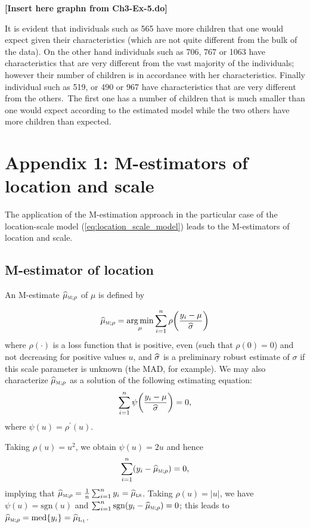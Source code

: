 \begin{stexample}
\textbf{[Insert here  graphn from Ch3-Ex-5.do]}\newline

It is evident that individuals such as 565 have more children that one would
expect given their characteristics (which are not quite\textbf{ }different
from the bulk of the data). On the other hand individuals such as 706, 767 or
1063 have characteristics that are very different from the vast majority of
the individuals; however their number of children is in accordance with her
characteristics. Finally individual such as 519, or 490 or 967 have
characteristics that are very different from the others.\ The first one has a
number of children that is much smaller than one would expect according to the
estimated model while the two others have more children than expected.
\end{stexample}

\section{Appendix 1: M-estimators of location and scale}
\label{sec:robreg:appendix1}

The application of the M-estimation approach in the particular case of the
location-scale model (\ref{eq:location_scale_model}) leads to the M-estimators
of location and scale.

\subsection{M-estimator of location}

An M-estimate $\sthat{\mu}_{\stsc{M};\rho}$ of $\mu$ is defined by%

\[
\sthat{\mu}_{\stsc{M};\rho}=\argmin_{\mu}\sum_{i=1}^{n}\rho\left(
\frac{y_{i}-\mu}{\sthat{\sigma}}\right)
\]
where $\rho\left(  \cdot\right)  $ is a loss function that is positive, even
(such that $\rho\left(  0\right)  =0$) and not decreasing for positive values
$u$, and $\widehat{\sigma}$ is a preliminary robust estimate of $\sigma$ if
this scale parameter is unknown (the MAD, for example). We may also
characterize $\sthat{\mu}_{\stsc{M};\rho}$ as a solution of the following
estimating equation:
\begin{equation}
\sum_{i=1}^{n}\psi\left(  \frac{y_{i}-\mu}{\sthat{\sigma}}\right)  =0,
\label{eq:M_location_equation}%
\end{equation}
where $\psi(u)=\rho^{\prime}(u)$.

Taking $\rho\left(  u\right)  =u^{2}$, we obtain $\psi\left(  u\right)  =2u$
and hence
\[
\sum_{i=1}^{n}\left(  y_{i}-\sthat{\mu}_{\stsc{M};\rho}\right)  =0,
\]
implying that $\sthat{\mu}_{\stsc{M};\rho}=\frac{1}{n}\sum_{i=1}^{n}%
y_{i}=\sthat{\mu}_{\stsc{LS}}$. Taking $\rho\left(  u\right)  =\left\vert
u\right\vert $, we have $\psi(u)=\mathrm{sgn}(u)$ and $\sum_{i=1}%
^{n}\mathrm{sgn}\left(  y_{i}-\sthat{\mu}_{\stsc{M};\rho}\right)  =0$;
this leads to $\sthat{\mu}_{\stsc{M};\rho}=\mathrm{med}\left\{
y_{i}\right\}  =\sthat{\mu}_{\mathrm{L}_{\mathrm{1}}}$.

